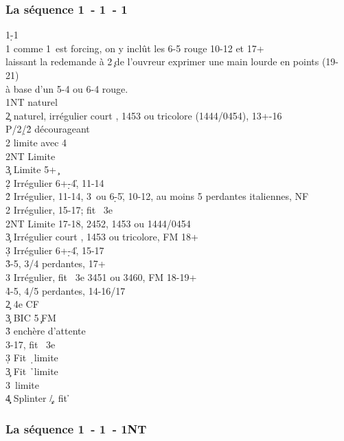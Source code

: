 \documentclass[a4paper]{article}
\begin{document}
\subsubsection{La séquence 1\pdfd\ - 1\pdfh\ - 1\pdfs}

\begin{bidtable}
1\d-1\h\\
1\s \> comme 1\s\ est forcing, on y inclût les 6-5 rouge 10-12 et 17+\\
\>laissant la redemande à 2\c\ de l'ouvreur	exprimer une main lourde en points (19-21)\\
\>à base d'un 5-4 ou 6-4 rouge.\+\\
1NT \> naturel\+\\
2\c \> naturel, irrégulier court \s , 1453 ou tricolore (1444/0454), 13+-16\+\\
P/2\d/2\h \> décourageant\\
2\s \> limite avec 4\c \\
2NT \> Limite\\
3\c \> Limite 5+ \c \-\\
2\d \> Irrégulier 6+\d -4\h , 11-14\\
2\h \> Irrégulier, 11-14, 3\s\ ou 6\d -5\h , 10-12, au moins 5 perdantes italiennes, NF\\
2\s \> Irrégulier, 15-17; fit \s\ 3e\\
2NT \> Limite 17-18, 2452, 1453 ou 1444/0454\\
3\c \> Irrégulier court \s , 1453 ou tricolore, FM 18+\\
3\d \> Irrégulier 6+\d -4\h , 15-17\\
3\h {}-5, 3/4 perdantes, 17+\\
3\s \> Irrégulier, fit \s\ 3e 3451 ou 3460, FM 18-19+\\
4\h {}-5, 4/5 perdantes, 14-16/17\-\\
2\c \> 4e CF\\
3\c \> BIC 5\c\ FM\+\\
3\h \> enchère d'attente\\
3\s {}-17, fit \s\ 3e\-\\
3\d \> Fit \d\ limite\\
3\c \> Fit \h\ limite\\
3\s {}\s\ limite\\
4\c\d \> Splinter \c /\d , fit \h \-
\end{bidtable}

\subsubsection{La séquence 1\pdfd\ - 1\pdfh\ - 1NT}
\end{document}
